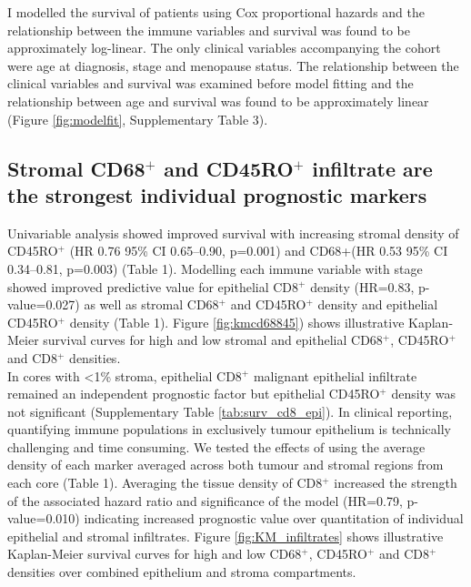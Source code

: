  I modelled the survival of patients using Cox proportional hazards and the relationship between the immune variables and survival was found to be approximately log-linear. The only clinical variables accompanying the cohort were age at diagnosis, stage and menopause status. The relationship between the clinical variables and survival was examined before model fitting and the relationship between age and survival was found to be approximately linear (Figure \ref{fig:modelfit}, Supplementary Table 3). 

\subsection[Prognostic value of individual infiltrates]{Stromal CD68$^+$ and CD45RO$^+$ infiltrate are the strongest individual prognostic markers}
Univariable analysis showed improved survival with increasing stromal density of CD45RO$^+$ (HR 0.76 95\% CI 0.65–0.90, p=0.001) and CD68+(HR 0.53 95\% CI 0.34–0.81, p=0.003) (Table 1). Modelling each immune variable with stage showed improved predictive value for epithelial CD8$^+$ density (HR=0.83, p-value=0.027) as well as stromal CD68$^+$ and CD45RO$^+$ density and epithelial CD45RO$^+$ density (Table 1). Figure \ref{fig:kmcd68845}) shows illustrative Kaplan-Meier survival curves for high and low stromal and epithelial CD68$^+$, CD45RO$^+$ and CD8$^+$ densities.\\

In cores with <1\% stroma, epithelial CD8$^+$ malignant epithelial infiltrate remained an independent prognostic factor but epithelial CD45RO$^+$ density was not significant (Supplementary Table \ref{tab:surv_cd8_epi}).
In clinical reporting, quantifying immune populations in exclusively tumour epithelium is technically challenging and time consuming. We tested the effects of using the average density of each marker averaged across both tumour and stromal regions from each core (Table 1).  Averaging the tissue density of CD8$^+$ increased the strength of the associated hazard ratio and significance of the model (HR=0.79, p-value=0.010) indicating increased prognostic value over quantitation of individual epithelial and stromal infiltrates. Figure \ref{fig:KM_infiltrates} shows illustrative Kaplan-Meier survival curves for high and low CD68$^+$, CD45RO$^+$ and CD8$^+$ densities over combined epithelium  and stroma compartments.\\

